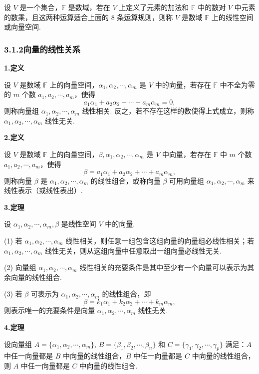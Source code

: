 \documentclass[UTF8,12pt,a4paper,fontset=fandol]{ctexart}
\begin{document}
设 $V$ 是一个集合，$\mathbb{F}$ 是数域，若在 $V$ 上定义了元素的加法和 $\mathbb{F}$ 中的数对 $V$ 中元素的数乘，且这两种运算适合上面的 8 条运算规则，则称 $V$ 是数域 $\mathbb{F}$ 上的线性空间或向量空间.

\subsubsection*{3.1.2\quad 向量的线性关系}

\noindent\textbf{1.\quad 定义}

设 $V$ 是数域 $\mathbb{F}$ 上的向量空间，$\alpha_1,\alpha_2,\cdots,\alpha_m$ 是 $V$ 中的向量，若存在 $\mathbb{F}$ 中不全为零的 $m$ 个数 $a_1,a_2,\cdots,a_m$，使得
\[
a_1\alpha_1+a_2\alpha_2+\cdots+a_m\alpha_m=0,
\]
则称向量组 $\alpha_1,\alpha_2,\cdots,\alpha_m$ 线性相关. 反之，若不存在这样的数使得上式成立，则称 $\alpha_1,\alpha_2,\cdots,\alpha_m$ 线性无关.

\noindent\textbf{2.\quad 定义}

设 $V$ 是数域 $\mathbb{F}$ 上的向量空间，$\beta,\alpha_1,\alpha_2,\cdots,\alpha_m$ 是 $V$ 中向量，若存在 $\mathbb{F}$ 中 $m$ 个数 $a_1,a_2,\cdots,a_m$，使得
\[
\beta=a_1\alpha_1+a_2\alpha_2+\cdots+a_m\alpha_m,
\]
则称向量 $\beta$ 是 $\alpha_1,\alpha_2,\cdots,\alpha_m$ 的线性组合，或称向量 $\beta$ 可用向量组 $\alpha_1,\alpha_2,\cdots,\alpha_m$ 来线性表示（或线性表出）.

\noindent\textbf{3.\quad 定理}

设 $\alpha_1,\alpha_2,\cdots,\alpha_m,\beta$ 是线性空间 $V$ 中的向量.

(1) 若 $\alpha_1,\alpha_2,\cdots,\alpha_m$ 线性相关，则任意一组包含这组向量的向量组必线性相关；若 $\alpha_1,\alpha_2,\cdots,\alpha_m$ 线性无关，则从这组向量中任意取出一组向量必线性无关.

(2) 向量组 $\alpha_1,\alpha_2,\cdots,\alpha_m$ 线性相关的充要条件是其中至少有一个向量可以表示为其余向量的线性组合.

(3) 若 $\beta$ 可表示为 $\alpha_1,\alpha_2,\cdots,\alpha_m$ 的线性组合，即
\[
\beta=k_1\alpha_1+k_2\alpha_2+\cdots+k_m\alpha_m,
\]
则表示唯一的充要条件是向量 $\alpha_1,\alpha_2,\cdots,\alpha_m$ 线性无关.

\noindent\textbf{4.\quad 定理}

设向量组 $A=\{\alpha_1,\alpha_2,\cdots,\alpha_m\}$, $B=\{\beta_1,\beta_2,\cdots,\beta_n\}$ 和 $C=\{\gamma_1,\gamma_2,\cdots,\gamma_p\}$ 满足：$A$ 中任一向量都是 $B$ 中向量的线性组合，$B$ 中任一向量都是 $C$ 中向量的线性组合，则 $A$ 中任一向量都是 $C$ 中向量的线性组合.
\end{document}
